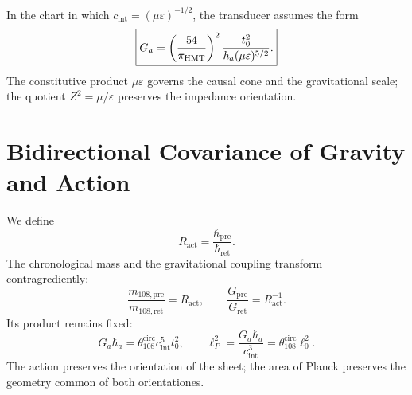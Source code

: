 In the chart in which \(c_{\mathrm{int}}=(\mu\varepsilon)^{-1/2}\), the
transducer assumes the form
\begin{equation}
 \boxed{
 G_a=\left(\frac{54}{\pi_{\rm HMT}}\right)^2
 \frac{t_0^2}{\hbar_a(\mu\varepsilon)^{5/2}}.}
 \label{eq:l9s102:g-mu-epsilon}
\end{equation}
The constitutive product \(\mu\varepsilon\) governs the causal cone and the
gravitational scale; the quotient \(Z^2=\mu/\varepsilon\) preserves the
impedance orientation.

\section{Bidirectional Covariance of Gravity and Action}
\label{sec:l9s102:g-hbar}

We define
\begin{equation}
 R_{\mathrm{act}}=\frac{\hbar_{\mathrm{pre}}}
 {\hbar_{\mathrm{ret}}}.
 \label{eq:l9s102:r-act}
\end{equation}
The chronological mass and the gravitational coupling transform contragrediently:
\begin{equation}
 \frac{m_{108,\mathrm{pre}}}{m_{108,\mathrm{ret}}}=R_{\mathrm{act}},
 \qquad
 \frac{G_{\mathrm{pre}}}{G_{\mathrm{ret}}}=R_{\mathrm{act}}^{-1}.
 \label{eq:l9s102:g-hbar-reciprocidad}
\end{equation}
Its product remains fixed:
\begin{equation}
 \boxed{
 G_a\hbar_a
 =\theta_{108}^{\mathrm{circ}}c_{\mathrm{int}}^5t_0^2,
 \qquad
 \ell_P^2=\frac{G_a\hbar_a}{c_{\mathrm{int}}^3}
 =\theta_{108}^{\mathrm{circ}}\ell_0^2.}
 \label{eq:l9s102:g-hbar-invariante}
\end{equation}
The action preserves the orientation of the sheet; the area of Planck preserves the
geometry common of both orientationes.

